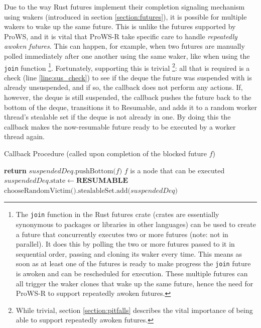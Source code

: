 \documentclass[bsc,frontabs,singlespacing,parskip,deptreport,normalheadings]{infthesis}
\begin{document}
Due to the way Rust futures implement their completion signaling mechanism using
wakers (introduced in section \ref{section:futures}), it is possible for
multiple wakers to wake up the same future. This is unlike the futures supported
by ProWS, and it is vital that ProWS-R take specific care to handle
\textit{repeatedly awoken futures}. This can happen, for
example, when two futures are manually polled immediately after one another
using the same waker, like when using the \texttt{join} function \footnote{The
    \texttt{join} function in the Rust futures crate \cite{noauthor_join_nodate}
    (crates are essentially synonymous to packages or libraries in other
    languages) can be used to create a future that concurrently executes two or
    more futures (note: not in parallel). It does this by polling the two or
    more futures passed to it in sequential order, passing and cloning its waker
    every time. This means as soon as at least one of the futures is ready to
    make progress the \texttt{join} future is awoken and can be rescheduled for
    execution. These multiple futures can all trigger the waker clones that wake
    up the same future, hence the need for ProWS-R to support repeatedly awoken
futures.}. Fortunately, supporting this is trivial \footnote{While trivial, section
\ref{section:pitfalls} describes the vital importance of being able to support
repeatedly awoken futures.}: all that is required is a
check (line \ref{line:sus_check}) to see if the deque the future was suspended
with is already unsuspended, and if so, the callback does not perform any
actions. If, however, the deque is still suspended, the callback pushes the
future back to the bottom of the deque, transitions it to Resumable, and adds it
to a random worker thread's stealable set if the deque is not already in one. By
doing this the callback makes the now-resumable future ready to be executed by a
worker thread again.

\begin{algorithm}
\caption{Callback Procedure (called upon completion of the blocked future $f$)}
\label{alg:callback}
\begin{algorithmic}[1]
     \label{line:callback}
            \label{line:sus_check}
            \State \textbf{return}
        \EndIf
        \State $suspendedDeq \text{.pushBottom(} f \text{)}$ \Comment $f$ is a node
            that can be executed
        \State $suspendedDeq\text{.state} \gets \textbf{RESUMABLE}$
            \State $\text{chooseRandomVictim().stealableSet.add(} suspendedDeq
                \text{)}$
        \EndIf
    \EndFunction
\end{algorithmic}
\end{algorithm}
\end{document}
